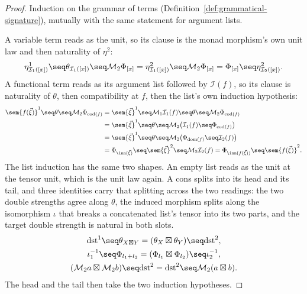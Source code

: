 \begin{proof}
\leanok
Induction on the grammar of terms
(Definition~\ref{def:grammatical-signature}), mutually with the same
statement for argument lists.

A variable term reads as the unit, so its clause is the monad morphism's
own unit law and then naturality of $\eta^2$:
\[
  \eta^1_{\mathcal I_1([x])} \seq \theta_{\mathcal I_1([x])} \seq
  \mathcal M_2\Phi_{[x]}
  = \eta^2_{\mathcal I_1([x])} \seq \mathcal M_2\Phi_{[x]}
  = \Phi_{[x]} \seq \eta^2_{\mathcal I_2([x])}.
\]
A functional term reads as its argument list followed by $\mathcal I(f)$,
so its clause is naturality of $\theta$, then compatibility at $f$, then
the list's own induction hypothesis:
\begin{align*}
  \sem{f(\vec\xi)}^1 \seq \theta \seq \mathcal M_2\Phi_{\mathrm{cod}(f)}
  &= \sem{\vec\xi}^1 \seq \mathcal M_1\mathcal I_1(f) \seq \theta \seq
     \mathcal M_2\Phi_{\mathrm{cod}(f)} \\
  &= \sem{\vec\xi}^1 \seq \theta \seq
     \mathcal M_2\bigl(\mathcal I_1(f) \seq \Phi_{\mathrm{cod}(f)}\bigr) \\
  &= \sem{\vec\xi}^1 \seq \theta \seq
     \mathcal M_2\bigl(\Phi_{\mathrm{dom}(f)} \seq \mathcal I_2(f)\bigr) \\
  &= \Phi_{\inn(\vec\xi)} \seq \sem{\vec\xi}^2 \seq \mathcal M_2\mathcal I_2(f)
   = \Phi_{\inn(f(\vec\xi))} \seq \sem{f(\vec\xi)}^2 .
\end{align*}
The list induction has the same two shapes. An empty list reads as the
unit at the tensor unit, which is the unit law again. A cons splits into
its head and its tail, and three identities carry that splitting across
the two readings: the two double strengths agree along $\theta$, the
induced morphism splits along the isomorphism $\iota$ that breaks a
concatenated list's tensor into its two parts, and the target double
strength is natural in both slots.
\begin{gather*}
  \mathrm{dst}^1 \seq \theta_{X \boxtimes Y}
    = (\theta_X \boxtimes \theta_Y) \seq \mathrm{dst}^2, \\
  \iota_1^{-1} \seq \Phi_{l_1 + l_2}
    = (\Phi_{l_1} \boxtimes \Phi_{l_2}) \seq \iota_2^{-1}, \\
  (\mathcal M_2 a \boxtimes \mathcal M_2 b) \seq \mathrm{dst}^2
    = \mathrm{dst}^2 \seq \mathcal M_2(a \boxtimes b).
\end{gather*}
The head and the tail then take the two induction hypotheses.
\end{proof}

